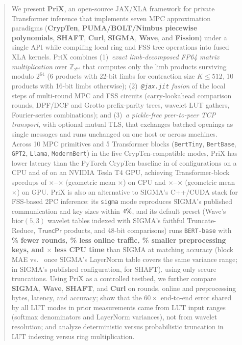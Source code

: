 \documentclass[11pt]{article}
\newcommand{\Zring}{\mathbb{Z}_{2^{64}}}
\begin{document}
\begin{abstract}
We present \textbf{PriX}, an open-source JAX/XLA framework for private Transformer inference that implements seven MPC approximation paradigms (\textbf{CrypTen}, \textbf{PUMA/BOLT/Nimbus piecewise polynomials}, \textbf{SHAFT}, \textbf{Curl}, \textbf{SIGMA}, \textbf{Wave}, and \textbf{Fission}) under a single API while compiling local ring and FSS tree operations into fused XLA kernels. PriX combines (1)~\emph{exact limb-decomposed FP64 matrix multiplication} over $\Zring$ that computes only the limb products surviving modulo $2^{64}$ (6 products with 22-bit limbs for contraction size $K \le 512$, 10 products with 16-bit limbs otherwise); (2)~\emph{\texttt{@jax.jit} fusion} of the local steps of multi-round MPC and FSS circuits (carry-lookahead comparison rounds, DPF/DCF and Grotto prefix-parity trees, wavelet LUT gathers, Fourier-series combinations); and (3)~\emph{a pickle-free peer-to-peer TCP transport}, with optional mutual TLS, that exchanges batched openings as single messages and runs unchanged on one host or across machines. Across 10 MPC primitives and 5 Transformer blocks (\texttt{BertTiny}, \texttt{BertBase}, \texttt{GPT2}, \texttt{Llama}, \texttt{ModernBert}) in the five CrypTen-compatible modes, PriX has lower latency than the PyTorch CrypTen baseline in \cpuNumFaster{} of \cpuNumConfigs{} configurations on a CPU and \gpuNumFaster{} of \gpuNumConfigs{} on an NVIDIA Tesla T4 GPU, achieving Transformer-block speedups of \textbf{\cpuLlmSpeedupMin$\times$--\cpuLlmSpeedupMax$\times$} (geometric mean \cpuLlmSpeedupGeomean$\times$) on CPU and \textbf{\gpuLlmSpeedupMin$\times$--\gpuLlmSpeedupMax$\times$} (geometric mean \gpuLlmSpeedupGeomean$\times$) on GPU. PriX is also an alternative to SIGMA's C++/CUDA stack for FSS-based 2PC inference: its \texttt{sigma} mode reproduces SIGMA's published communication and key sizes within $\SigmaGeluKeyMatchPct\%$, and its default preset (Wave's $\text{bior}(5,3)$ wavelet tables indexed with SIGMA's faithful Truncate-Reduce, $\mathsf{TruncPr}$ products, and 48-bit comparisons) runs \texttt{BERT-base} with \textbf{\DefaultVsSigmaRoundsPct\% fewer rounds, \DefaultVsSigmaOnlinePct\% less online traffic, \DefaultVsSigmaKeyPct\% smaller preprocessing keys, and \DefaultVsSigmaTimeX$\times$ less CPU time} than SIGMA at matching accuracy (block MAE \BertBaseDefaultMAE{} vs.\ \BertBaseSigmaExtMAE{} once SIGMA's LayerNorm table covers the same variance range; \BertBaseSigmaMAE{} in SIGMA's published configuration, \BertBaseShaftMAE{} for SHAFT), using only secure truncations. Using PriX as a controlled testbed, we further compare \textbf{SIGMA}, \textbf{Wave}, \textbf{SHAFT}, and \textbf{Curl} on rounds, online and preprocessing bytes, latency, and accuracy; show that the $60\times$ end-to-end error shared by all LUT modes in prior measurements came from LUT input ranges (softmax denominators and LayerNorm variances), not from wavelet resolution; and analyze deterministic versus probabilistic truncation in LUT indexing versus ring multiplication.
\end{abstract}
\end{document}
